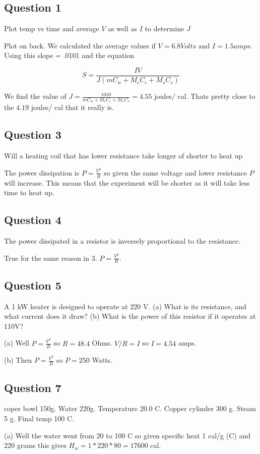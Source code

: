 \documentclass[a4paper,12pt]{article}
\begin{document}
\subsection{Question 1}
Plot temp vs time and average $V$ as well as $I$ to determine $J$

Plot on back. We calculated the average values if $V = 6.8 Volts$ and $I = 1.5 amps$. Using this slope = .0101 and the equation

\begin{equation}
S = \frac{IV}{J(mC_w + M_cC_c + M_sC_s)}
\end{equation}

We find the value of $J = \frac{1010}{mC_w + M_cC_c + M_sC_s} = 4.55$ joules/ cal. Thats pretty close to the $4.19$ joules/ cal that it really is.

\subsection{Question 3}
Will a heating coil that has lower resistance take longer of shorter to heat up

The power dissipation is $P = \frac{V^2}{R}$ so given the same voltage and lower resistance $P$ will increase. This means that the experiment will be shorter as it will take less time to heat up.
\subsection{Question 4}
The power dissipated in a resistor is inversely proportional to the resistance.

True for the same reason in 3. $P = \frac{V^2}{R}$.
\subsection{Question 5}
A 1 kW heater is designed to operate at 220 V. (a) What is its resistance, and what current does it draw? (b) What is the power of this resistor if it operates at 110V?

(a) Well $P = \frac{V^2}{R}$ so $R = 48.4$ Ohms. $V/R = I$ so $I = 4.54$ amps. 

(b) Then $P = \frac{V^2}{R}$ so $P = 250$ Watts.
\subsection{Question 7}
coper bowl 150g. Water 220g. Temperature 20.0 C. Copper cylinder 300 g. Steam 5 g. Final temp 100 C.

(a) Well the water went from 20 to 100 C so given specific heat 1 cal/g (C) and 220 grams this gives $H_w = 1 * 220 * 80 = 17600$ cal. 
\end{document}
